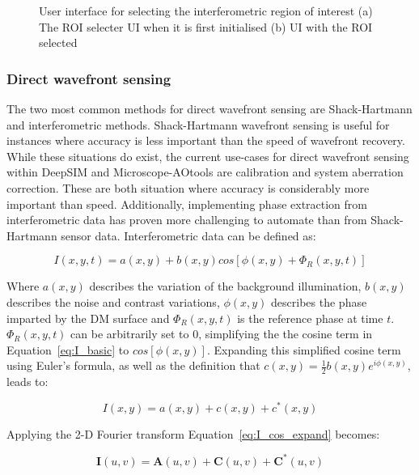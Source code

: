 \begin{figure}[h]
\begin{subfigure}{0.4\textwidth}
		\caption{}
		\label{fig:ROI_selector}
	\end{subfigure}
	\caption{User interface for selecting the interferometric region of interest (a) The ROI selecter UI when it is first initialised (b) UI with the ROI selected}
	\label{fig:ROI_selectors}
\end{figure}

\subsubsection{Direct wavefront sensing}
\label{subsubsec:direct_wavefront_sensing}

The two most common methods for direct wavefront sensing are Shack-Hartmann and interferometric methods. Shack-Hartmann wavefront sensing is useful for instances where accuracy is less important than the speed of wavefront recovery. While these situations do exist, the current use-cases for direct wavefront sensing within DeepSIM and Microscope-AOtools are calibration and system aberration correction. These are both situation where accuracy is considerably more important than speed. Additionally, implementing phase extraction from interferometric data has proven more challenging  to automate than from Shack-Hartmann sensor data. Interferometric data can be defined as:

\begin{equation}\label{eq:I_basic}
I(x,y,t) = a(x,y) + b(x,y)cos[\phi(x,y) + \Phi_{R}(x,y,t)]
\end{equation}

Where $a(x,y)$ describes the variation of the background illumination, $b(x,y)$ describes the noise and contrast variations, $\phi(x,y)$ describes the phase imparted by the DM surface and $\Phi_{R}(x,y,t)$ is the reference phase at time $t$. $\Phi_{R}(x,y,t)$ can be arbitrarily set to 0, simplifying the the cosine term in Equation~\ref{eq:I_basic} to $cos[\phi(x,y)]$. Expanding this simplified cosine term using Euler's formula, as well as the definition that $c(x,y) = \frac{1}{2}b(x,y)e^{i\phi(x,y)}$, leads to:

\begin{equation}\label{eq:I_cos_expand}
I(x,y) = a(x,y) + c(x,y) + c^{*}(x,y)
\end{equation}

Applying the 2-D Fourier transform Equation~\ref{eq:I_cos_expand} becomes:

\begin{equation}\label{eq:I_fourier}
\boldsymbol{I}(u,v) = \boldsymbol{A}(u,v) + \boldsymbol{C}(u,v) + \boldsymbol{C}^{*}(u,v)
\end{equation}

